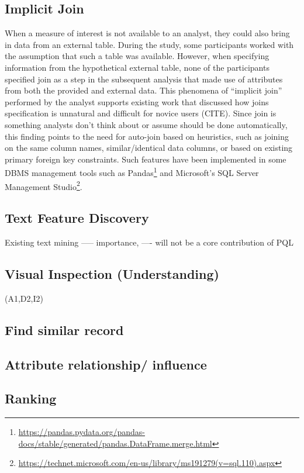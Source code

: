 \documentclass{sig-alternate-05-2015}
\begin{document}
\subsection{Implicit Join}
 \par When a measure of interest is not available to an analyst, they could also bring in data from an external table. During the study, some participants worked with the assumption that such a table was available. However, when specifying information from the hypothetical external table, none of the participants specified join as a step in the subsequent analysis that made use of attributes from both the provided and external data. This phenomena of ``implicit join'' performed by the analyst supports existing work that discussed how joins specification is unnatural and difficult for novice users (CITE). Since join is something analysts don't think about or assume should be done automatically, this finding points to the need for auto-join based on heuristics, such as joining on the same column names, similar/identical data columns, or based on existing primary foreign key constraints. Such features have been implemented in some DBMS management tools such as Pandas\footnote{\url{https://pandas.pydata.org/pandas-docs/stable/generated/pandas.DataFrame.merge.html}} and Microsoft's SQL Server Management Studio\footnote{\url{https://technet.microsoft.com/en-us/library/ms191279(v=sql.110).aspx}}.
\subsection{Text Feature Discovery}
Existing text mining ----- importance, ---- will not be a core contribution of PQL 
\subsection{Visual Inspection (Understanding)} (A1,D2,I2)
\subsection{Find similar record}
\subsection{Attribute relationship/ influence}
\subsection{Ranking}
\end{document}
